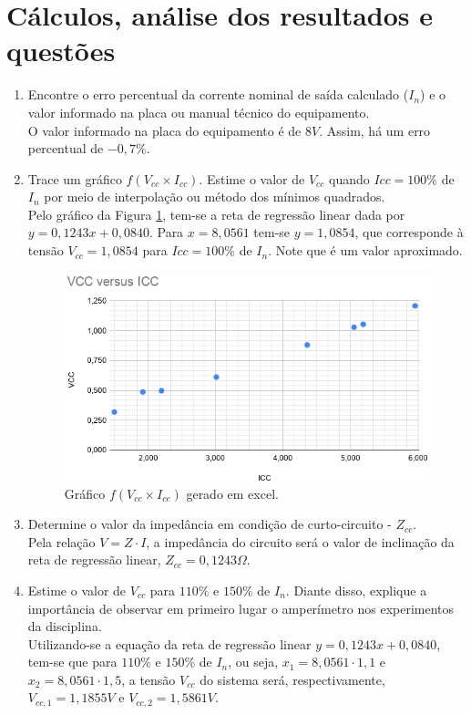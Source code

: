 \documentclass[a4paper,12pt,oneside,openany,table,xcdraw]{article}
\begin{document}
\section{Cálculos, análise dos resultados e questões} %
\begin{enumerate}[1)]
\item Encontre o erro percentual da corrente nominal de saída calculado ($I_n$) e o valor informado na placa ou manual técnico do equipamento.\\
O valor informado na placa do equipamento é de $8V$. Assim, há um erro percentual de $-0,7\%$.

\item Trace um gráfico $f(V_{cc}\times I_{cc})$. Estime o valor de $V_{cc}$ quando $Icc=100\%$ de $I_n$ por meio de interpolação ou método dos mínimos quadrados.\\
Pelo gráfico da Figura \ref{graph}, tem-se a reta de regressão linear dada por $y=0,1243x+0,0840$. Para $x=8,0561$ tem-se $y=1,0854$, que corresponde à tensão $V_{cc}=1,0854$ para $Icc=100\%$ de $I_n$. Note que é um valor aproximado.

\begin{figure}[H]
\centering
\captionsetup{font=scriptsize}
\includegraphics[width=14.5cm]{graph}
\caption{Gráfico $f(V_{cc}\times I_{cc})$ gerado em excel.}
\label{graph}
\end{figure}

\item Determine o valor da impedância em condição de curto-circuito - $Z_{cc}$.\\
Pela relação $V=Z\cdot I$, a impedância do circuito será o valor de inclinação da reta de regressão linear, $Z_{cc}=0,1243\Omega$.

\item Estime o valor de $V_{cc}$ para $110\%$ e $150\%$ de $I_n$. Diante disso, explique a importância de observar em primeiro lugar o amperímetro nos experimentos da disciplina.\\
Utilizando-se a equação da reta de regressão linear $y=0,1243x+0,0840$, tem-se que para $110\%$ e $150\%$ de $I_n$, ou seja, $x_1=8,0561\cdot1,1$ e $x_2=8,0561\cdot1,5$, a tensão $V_{cc}$ do sistema será, respectivamente, $V_{cc, 1}=1,1855 V$ e $V_{cc, 2}=1,5861 V$.


\end{enumerate}
\end{document}
